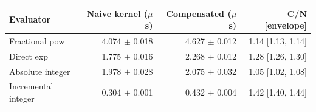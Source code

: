 \begin{tabular}{lrrr}
\toprule
Evaluator & Naive kernel ($\mu$s) & Compensated ($\mu$s) & C/N [envelope] \\
\midrule
Fractional pow & 4.074 $\pm$ 0.018 & 4.627 $\pm$ 0.012 & 1.14 [1.13, 1.14] \\
Direct exp & 1.775 $\pm$ 0.016 & 2.268 $\pm$ 0.012 & 1.28 [1.26, 1.30] \\
Absolute integer & 1.978 $\pm$ 0.028 & 2.075 $\pm$ 0.032 & 1.05 [1.02, 1.08] \\
Incremental integer & 0.304 $\pm$ 0.001 & 0.432 $\pm$ 0.004 & 1.42 [1.40, 1.44] \\
\bottomrule
\end{tabular}
